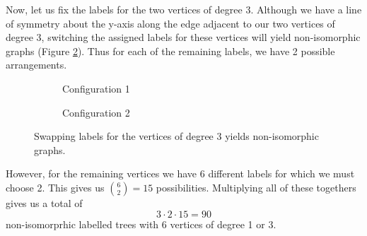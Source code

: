 \documentclass[11pt, oneside]{article}   	%
\begin{document}
Now, let us fix the labels for the two vertices of degree 3. Although we have a line of symmetry about the y-axis along the edge adjacent to our two vertices of degree 3, switching the assigned labels for these vertices will yield non-isomorphic graphs (Figure \ref{q60 swap}). Thus for each of the remaining labels, we have 2 possible arrangements.

 \begin{figure}[h]
    \centering
    
    \begin{subfigure}[b]{0.4\columnwidth}             
    \centering
      \caption{Configuration 1}
      \label{A}
    \end{subfigure}
    \begin{subfigure}[b]{0.4\columnwidth}
      \centering
      \caption{Configuration 2}
    \end{subfigure}
    \caption{Swapping labels for the vertices of degree 3 yields non-isomorphic graphs.}
    \label{q60 swap}
    \end{figure}

However,  for the remaining vertices we have 6 different labels for which we must choose 2. This gives us ${6 \choose 2}=15$ possibilities. Multiplying all of these togethers gives us a total of
$$3 \cdot 2 \cdot 15 = 90$$
non-isomorprhic labelled trees with 6 vertices of degree 1 or 3.
\end{document}
